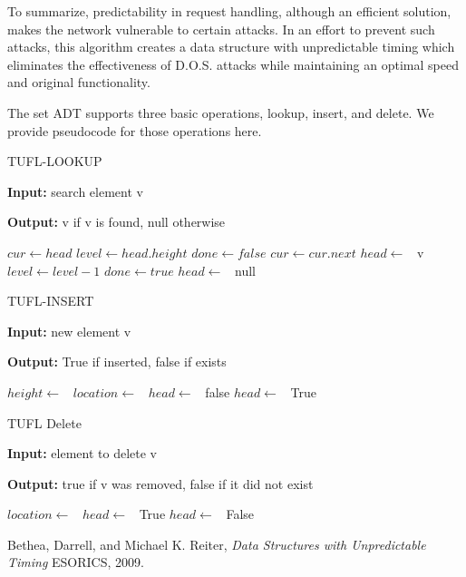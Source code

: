 \documentclass[11pt]{article}
\begin{document}

	To summarize, predictability in request handling, although an efficient solution, makes the network vulnerable to certain attacks. In an effort to prevent such attacks, this algorithm creates a data structure with unpredictable timing which eliminates the effectiveness of D.O.S. attacks while maintaining an optimal speed and original functionality.


The set ADT supports three basic operations, lookup, insert, and delete. We provide pseudocode
for those operations here.

\begin{algorithm}
\caption{TUFL-LOOKUP}
\textbf{Input:} search element v

\textbf{Output:} v if v is found, null otherwise

\begin{algorithmic}[1]
\State $cur \gets head$
\State $level \gets head.height$
\State $done \gets false$
		\State $cur \gets cur.next$
		\State $head \gets$\ 
		\State \Return v
		\State $level \gets level-1$
	\Else
		\State $done \gets true$
	\EndIf
\EndWhile
\State $head \gets$\ 
\State \Return null
\end{algorithmic}
\end{algorithm}

\begin{algorithm}
\caption{TUFL-INSERT}
\textbf{Input:} new element v

\textbf{Output:} True if inserted, false if exists

\begin{algorithmic}[1]
\State $height \gets$\ 
\State $location \gets$\ 
	\State $head \gets$\ 
	\State\Return false
\Else
\State $head \gets$\ 
\State{}
\State\Return True
\EndIf
\end{algorithmic}
\end{algorithm}



\begin{algorithm}
\caption{TUFL Delete}
\textbf{Input:} element to delete v

\textbf{Output:} true if v was removed, false if it did not exist

\begin{algorithmic}[1]
\State $location \gets$\ 
	\State {}
	\State $head \gets$\ 
	\State \Return True
\Else
	\State $head \gets$\ 
	\State \Return False
\EndIf
\end{algorithmic}
\end{algorithm}

\pagebreak

\begin{thebibliography}{9}
	
	Bethea, Darrell, and Michael K. Reiter,
	\emph{Data Structures with Unpredictable Timing}
	ESORICS,
	2009.
	
\end{thebibliography}
\end{document}
